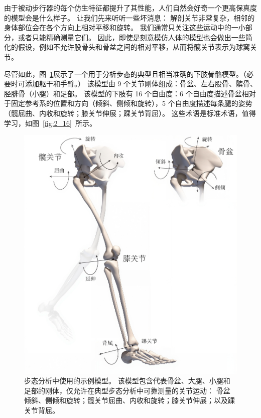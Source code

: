 由于被动步行器的每个仿生特征都提升了其性能，人们自然会好奇一个更高保真度的模型会是什么样子。
让我们先来听听一些坏消息：
解剖关节非常复杂，相邻的身体部位会在各个方向上相对平移和旋转。
我们通常只关注这些运动中的一小部分，或者只能精确测量它们。
因此，即使是刻意模仿人体的模型也会做出一些简化的假设，例如不允许股骨头和骨盆之间的相对平移，从而将髋关节表示为球窝关节。


尽管如此，图~\ref{fig:2_17}展示了一个用于分析步态的典型且相当准确的下肢骨骼模型。（必要时可添加躯干和手臂。）
该模型由 9 个关节刚体组成：骨盆、左右股骨、髌骨、胫腓骨（小腿）和足部。
该模型的下肢有 16 个自由度：6 个自由度描述骨盆相对于固定参考系的位置和方向（倾斜、侧倾和旋转），5 个自由度描述每条腿的姿势（髋屈曲、内收和旋转；膝关节伸展；踝关节背屈）。
这些术语是标准术语，值得学习，如图~\ref{fig:2_16}~所示。

\begin{figure}[!htb]
	\centering
	\includegraphics[width=1.0\linewidth]{chap2/2_17}
	\caption{步态分析中使用的示例模型。
		该模型包含代表骨盆、大腿、小腿和足部的刚体，仅允许在典型步态分析中可靠测量的关节运动：
		骨盆倾斜、侧倾和旋转；髋关节屈曲、内收和旋转；膝关节伸展；以及踝关节背屈\cite{rajagopal2016full}。 \label{fig:2_17}}
\end{figure}


